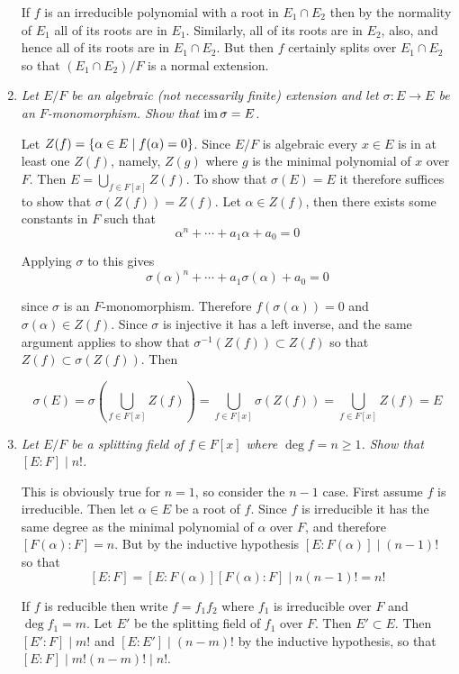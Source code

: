 \documentclass[10pt]{article}
\begin{document}
\begin{enumerate}
If $f$ is an irreducible polynomial with a root in $E_1 \cap E_2$ then by the normality of $E_1$ all of its roots are in $E_1$.  Similarly, all of its roots are in $E_2$, also, and hence all of its roots are in $E_1 \cap E_2$.  But then $f$ certainly splits over $E_1 \cap E_2$ so that $(E_1 \cap E_2)/F$ is a normal extension.

\item \emph{Let $E/F$ be an algebraic (not necessarily finite) extension and let $\sigma: E \rightarrow E$ be an $F$-monomorphism.  Show that $\operatorname{im} \sigma = E$.}

Let $Z(f) = \left\{ \alpha \in E \mid f(\alpha) = 0 \right\}$.  Since $E/F$ is algebraic every $x \in E$ is in at least one $Z(f)$, namely, $Z(g)$ where $g$ is the minimal polynomial of $x$ over $F$.  Then $E = \bigcup_{f \in F[x]} Z(f)$.  To show that $\sigma(E) = E$ it therefore suffices to show that $\sigma(Z(f)) = Z(f)$.  Let $\alpha \in Z(f)$, then there exists some constants in $F$ such that
\[
\alpha^n + \cdots + a_1\alpha + a_0 = 0
\]

Applying $\sigma$ to this gives
\[
\sigma(\alpha)^n + \cdots + a_1\sigma(\alpha) + a_0 = 0
\]

since $\sigma$ is an $F$-monomorphism.  Therefore $f(\sigma(\alpha)) = 0$ and $\sigma(\alpha) \in Z(f)$.  Since $\sigma$ is injective it has a left inverse, and the same argument applies to show that $\sigma^{-1}(Z(f)) \subset Z(f)$ so that $Z(f) \subset \sigma(Z(f))$.  Then

\[
\sigma(E) = \sigma\left(\bigcup_{f \in F[x]} Z(f)\right) = \bigcup_{f \in F[x]} \sigma(Z(f)) = \bigcup_{f \in F[x]} Z(f) = E
\]

\item \emph{Let $E/F$ be a splitting field of $f \in F[x]$ where $\deg f = n \geq 1$.  Show that $[E:F] \mid n!$.}

This is obviously true for $n=1$, so consider the $n-1$ case.  First assume $f$ is irreducible.  Then let $\alpha \in E$ be a root of $f$.  Since $f$ is irreducible it has the same degree as the minimal polynomial of $\alpha$ over $F$, and therefore $[F(\alpha):F] = n$.  But by the inductive hypothesis $[E:F(\alpha)] \mid (n-1)!$ so that $$[E:F] = [E:F(\alpha)][F(\alpha):F] \mid n(n-1)! = n!$$

If $f$ is reducible then write $f = f_1f_2$ where $f_1$ is irreducible over $F$ and $\deg f_1 = m$.  Let $E'$ be the splitting field of $f_1$ over $F$.  Then $E' \subset E$.  Then $[E':F] \mid m!$ and $[E:E'] \mid (n-m)!$ by the inductive hypothesis, so that $[E:F] \mid m!(n-m)! \mid n!$.


\end{enumerate}
\end{document}
